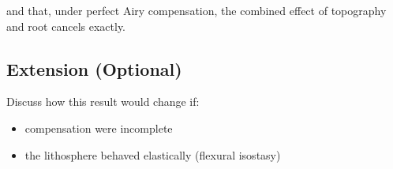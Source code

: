 \documentclass[11pt,a4paper]{article}
\begin{document}
and that, under perfect Airy compensation, the combined effect of topography and root cancels exactly.

\subsection*{Extension (Optional)}

Discuss how this result would change if:
\begin{itemize}
    \item compensation were incomplete
    \item the lithosphere behaved elastically (flexural isostasy)
\end{itemize}
\end{document}
